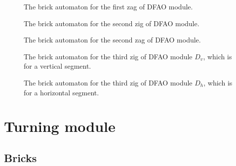 \documentclass[runningheads]{llncs}
\begin{document}
\begin{figure}[ht]
\centering
\caption{The brick automaton for the first zag of DFAO module.}
\label{fig:brick_automaton_Dzag1}
\end{figure}

\begin{figure}[ht]
\centering
\caption{The brick automaton for the second zig of DFAO module.}
\label{fig:brick_automaton_Dzig2}
\end{figure}

\begin{figure}[ht]
\centering
\caption{The brick automaton for the second zag of DFAO module.}
\label{fig:brick_automaton_Dzag2}
\end{figure}

\begin{figure}[ht]
\centering
\caption{The brick automaton for the third zig of DFAO module $D_v$, which is for a vertical segment.}
\label{fig:brick_automaton_Dzig3}
\end{figure}

\begin{figure}[ht]
\centering
\caption{The brick automaton for the third zig of DFAO module $D_h$, which is for a horizontal segment.}
\label{fig:brick_automaton_Dzig3_hori}
\end{figure}

	\section{Turning module}
	\label{ap_sect:Turner_module}

	\subsection{Bricks}
	\label{ap_subsect:Turner_module_bricks}
\end{document}
